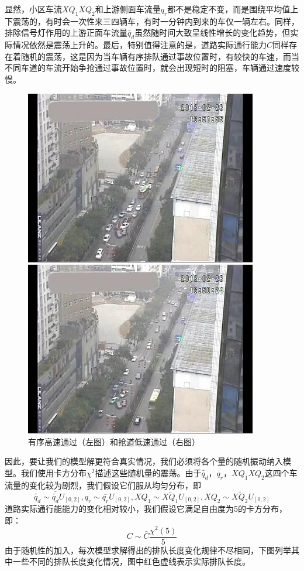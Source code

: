 \documentclass{cumcmart}
\begin{document}
显然，小区车流${XQ}_{1}{XQ}_{2}$和上游侧面车流量$q_{r}$都不是稳定不变，而是围绕平均值上下震荡的，有时会一次性来三四辆车，有时一分钟内到来的车仅一辆左右。同样，排除信号灯作用的上游正面车流量$\tilde{q_{d}}$虽然随时间大致呈线性增长的变化趋势，但实际情况依然是震荡上升的。最后，特别值得注意的是，道路实际通行能力$C$同样存在着随机的震荡，这是因为当车辆有序排队通过事故位置时，有较快的车速，而当不同车道的车流开始争抢通过事故位置时，就会出现短时的阻塞，车辆通过速度较慢。
\begin{figure}[h]
\centering
\begin{minipage}{.48\textwidth}
\centering
\includegraphics[width=.8\textwidth]{fig61}
\end{minipage}\hfill
\begin{minipage}{.48\textwidth}
\centering
\includegraphics[width=.8\textwidth]{fig62}
\end{minipage}
\caption{有序高速通过（左图）和抢道低速通过（右图）}
\end{figure}


因此，要让我们的模型解更符合真实情况，我们必须将各个量的随机振动纳入模型。我们使用卡方分布$ {\chi
}^{ {2}}$描述这些随机量的震荡。由于$\tilde{q_{d}} {，}q_{r} {，}{XQ}_{1}{XQ}_{2}$这四个车流量的变化较为剧烈，我们假设它们服从均匀分布，即
\[
\tilde{q_{d}}\sim \bar{\tilde{q_{d}}}U_{\left[ 0,2 \right]}, q_{r}\sim
\bar{q_{r}}U_{\left[ 0,2 \right]}, {XQ}_{1}\sim \bar{{XQ}_{1}}U_{\left[ 0,2
\right]}, {XQ}_{2}\sim \bar{{XQ}_{2}}U_{\left[ 0,2 \right]}
\]
道路实际通行能能力的变化相对较小，我们假设它满足自由度为5的卡方分布，即：
\[
C\sim \bar{C}\frac{\chi^{2}\left( 5 \right)}{5}
\]
由于随机性的加入，每次模型求解得出的排队长度变化规律不尽相同，下图列举其中一些不同的排队长度变化情况，图中红色虚线表示实际排队长度。
\end{document}
